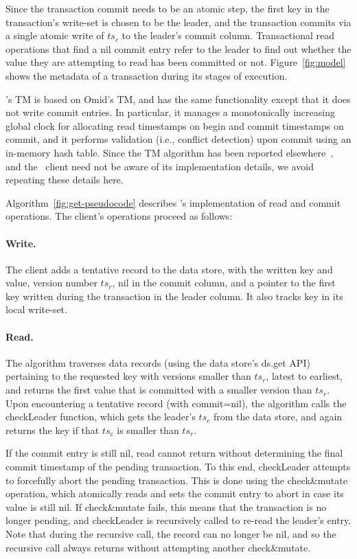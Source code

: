 Since the transaction commit needs to be an atomic step, the first key in the transaction's write-set is chosen to be the leader, and the transaction commits via a single atomic write of $ts_c$ to the leader's commit column. Transactional read operations that find a nil commit entry 
refer to the leader to find out whether the value they are attempting to read has been committed or not.
Figure~\ref{fig:model} shows the metadata of a transaction during its stages of execution. 

\sys's TM is based on Omid's TM, and has the same functionality except that it does not write commit entries.
In particular, it manages a monotonically increasing global clock for allocating read timestamps on begin and commit timestamps on commit,
and it performs validation (i.e., conflict detection) upon commit using an in-memory hash table. 
Since the TM algorithm has been reported elsewhere~\cite{Omid2017}, and the \sys\ client need not be aware of 
its implementation details, we avoid repeating these details here. 

Algorithm~\ref{fig:get-pseudocode} describes \sys's implementation of read and commit operations.
The client's operations proceed as follows:

\paragraph{Write.}
The client adds a tentative record to the data store, with the written key and value, version number $ts_r$, 
nil in the commit column, and a pointer to the first key written during the transaction in the leader column.
It also tracks key in its local write-set.


\paragraph{Read.}
The algorithm traverses data  records (using the data store's ds.get API) pertaining
to the requested key with versions smaller than $ts_r$, latest to earliest, and returns the first value that is committed
with a smaller version than $ts_r$. Upon
encountering a tentative record (with commit=nil), the algorithm calls the {\sc checkLeader} function, which
gets the leader's $ts_c$ from the data store, and again returns the key if that $ts_c$ is smaller than $ts_r$. 

If the commit entry is still nil, read cannot return without determining the final commit timestamp
of the pending transaction. 
To this end, {\sc checkLeader} attempts to forcefully abort the pending transaction. This is done using the
 {check\&mutate} operation, which atomically reads and sets the commit entry to abort in case its value is still nil.
If check\&mutate fails, this means that the transaction is no longer pending, and {\sc checkLeader} is recursively called
to re-read the leader's entry. Note that during the recursive call, the record can no longer be nil, and so the recursive call 
always returns without attempting another check\&mutate.
 
